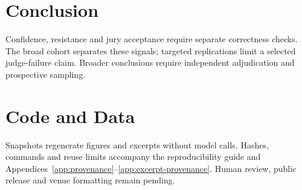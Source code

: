 \section{Conclusion}
\label{sec:conclusion}
Confidence, resistance and jury acceptance require separate correctness
checks. The broad cohort separates these signals; targeted replications
limit a selected judge-failure claim. Broader conclusions require independent
adjudication and prospective sampling.

\section*{Code and Data}
Snapshots regenerate figures and excerpts without model calls. Hashes,
commands and reuse limits accompany the reproducibility guide and
Appendices~\ref{app:provenance}--\ref{app:excerpt-provenance}.
Human review, public release and venue formatting remain pending.
